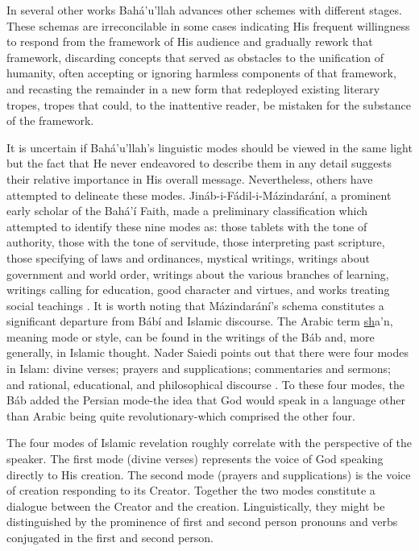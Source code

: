 \documentclass[12pt, oneside]{report}
\begin{document}
In several other works Bah\'{a}'u'llah advances other schemes with different stages.
These schemas are irreconcilable in some cases indicating His frequent willingness to respond from the framework of His audience and gradually rework that framework, discarding concepts that served as obstacles to the unification of humanity, often accepting or ignoring harmless components of that framework, and recasting the remainder in a new form that redeployed existing literary tropes, tropes that could, to the inattentive reader, be mistaken for the substance of the framework.
\par
It is uncertain if Bah\'{a}'u'llah's linguistic modes should be viewed in the same light but the fact that He never endeavored to describe them in any detail suggests their relative importance in His overall message.
Nevertheless, others have attempted to delineate these modes.
Jin\'{a}b-i-F\'{a}dil-i-M\'{a}zindar\'{a}n\'{i}, a prominent early scholar of the Bah\'{a}'\'{i} Faith, made a preliminary classification which attempted to identify these nine modes as: those tablets with the tone of authority, those with the tone of servitude, those interpreting past scripture, those specifying of laws and ordinances, mystical writings, writings about government and world order, writings about the various branches of learning, writings calling for education, good character and virtues, and works treating social teachings \cite{taherzadeh_revelation_1975}.
It is worth noting that M\'{a}zindar\'{a}n\'{i}'s schema constitutes a significant departure from B\'{a}b\'{i} and Islamic discourse. The Arabic term \underline{sh}a'n, meaning mode or style, can be found in the writings of the B\'{a}b and, more generally, in Islamic thought.
Nader Saiedi points out that there were four modes in Islam: divine verses; prayers and supplications; commentaries and sermons; and rational, educational, and philosophical discourse \cite{saiedi_gate_2008}.
To these four modes, the B\'{a}b added the Persian mode-the idea that God would speak in a language other than Arabic being quite revolutionary-which comprised the other four.
\par
The four modes of Islamic revelation roughly correlate with the perspective of the speaker.
The first mode (divine verses) represents the voice of God speaking directly to His creation.
The second mode (prayers and supplications) is the voice of creation responding to its Creator.
Together the two modes constitute a dialogue between the Creator and the creation.
Linguistically, they might be distinguished by the prominence of first and second person pronouns and verbs conjugated in the first and second person.
\end{document}
